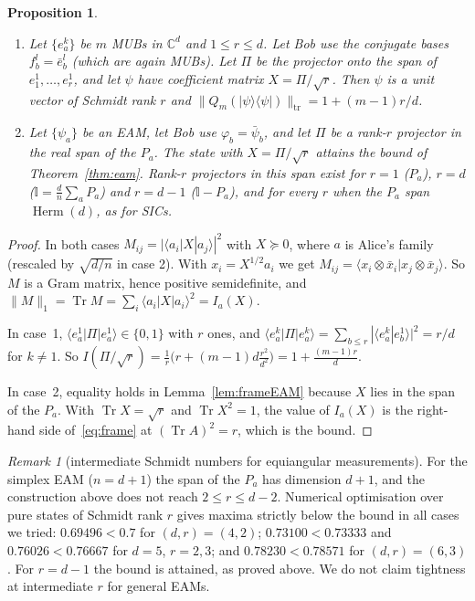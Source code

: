 \documentclass[11pt]{amsart}
\newtheorem{proposition}[theorem]{Proposition}
\theoremstyle{definition}
\theoremstyle{remark}
\newtheorem{remark}[theorem]{Remark}
\newcommand{\C}{\mathbb{C}}
\newcommand{\Tr}{\operatorname{Tr}}
\newcommand{\Herm}{\operatorname{Herm}}
\newcommand{\one}{\mathbb{I}}
\newcommand{\tr}{\mathrm{tr}}
\newcommand{\ket}[1]{|#1\rangle}
\newcommand{\bra}[1]{\langle #1|}
\begin{document}
\begin{proposition}\label{prop:tight}
\begin{enumerate}
\item Let $\{e^k_a\}$ be $m$ MUBs in $\C^d$ and $1\le r\le d$. Let Bob use the conjugate bases
$f^l_b=\bar e^l_b$ (which are again MUBs). Let $\Pi$ be the projector onto the span of $e^1_1,\dots,e^1_r$, and
let $\psi$ have coefficient matrix $X=\Pi/\sqrt r$. Then $\psi$ is a unit vector of Schmidt rank $r$ and
$\|Q_m(\ket\psi\bra\psi)\|_{\tr}=1+(m-1)r/d$.
\item Let $\{\psi_a\}$ be an EAM, let Bob use $\varphi_b=\bar\psi_b$, and let $\Pi$ be a rank-$r$ projector in the
real span of the $P_a$. The state with $X=\Pi/\sqrt r$ attains the bound of Theorem~\ref{thm:eam}. Rank-$r$
projectors in this span exist for $r=1$ ($P_a$), $r=d$ ($\one=\frac dn\sum_aP_a$) and $r=d-1$ ($\one-P_a$), and
for every $r$ when the $P_a$ span $\Herm(d)$, as for SICs.
\end{enumerate}
\end{proposition}

\begin{proof}
In both cases $M_{ij}=|\bra{a_i}X\ket{a_j}|^2$ with $X\succeq0$, where $a$ is Alice's family (rescaled by
$\sqrt{d/n}$ in case 2). With $x_i=X^{1/2}a_i$ we get $M_{ij}=\langle x_i\otimes\bar x_i|x_j\otimes\bar x_j\rangle$.
So $M$ is a Gram matrix, hence positive semidefinite, and $\|M\|_1=\Tr M=\sum_i\bra{a_i}X\ket{a_i}^2=I_a(X)$.

In case~1, $\bra{e^1_a}\Pi\ket{e^1_a}\in\{0,1\}$ with $r$ ones, and
$\bra{e^k_a}\Pi\ket{e^k_a}=\sum_{b\le r}|\langle e^k_a|e^1_b\rangle|^2=r/d$ for $k\ne1$. So
$I(\Pi/\sqrt r)=\frac1r\bigl(r+(m-1)d\frac{r^2}{d^2}\bigr)=1+\frac{(m-1)r}{d}$.

In case~2, equality holds in Lemma~\ref{lem:frameEAM} because $X$ lies in the span of the $P_a$. With
$\Tr X=\sqrt r$ and $\Tr X^2=1$, the value of $I_a(X)$ is the right-hand side of~\eqref{eq:frame} at
$(\Tr A)^2=r$, which is the bound.
\end{proof}

\begin{remark}[intermediate Schmidt numbers for equiangular measurements]
For the simplex EAM ($n=d+1$) the span of the $P_a$ has dimension $d+1$, and the construction above does not
reach $2\le r\le d-2$. Numerical optimisation over pure states of Schmidt rank $r$ gives maxima strictly below
the bound in all cases we tried: $0.69496<0.7$ for $(d,r)=(4,2)$; $0.73100<0.73333$ and $0.76026<0.76667$ for
$d=5$, $r=2,3$; and $0.78230<0.78571$ for $(d,r)=(6,3)$. For $r=d-1$ the bound is attained, as proved above. We do not claim tightness at intermediate $r$ for general EAMs.
\end{remark}
\end{document}
